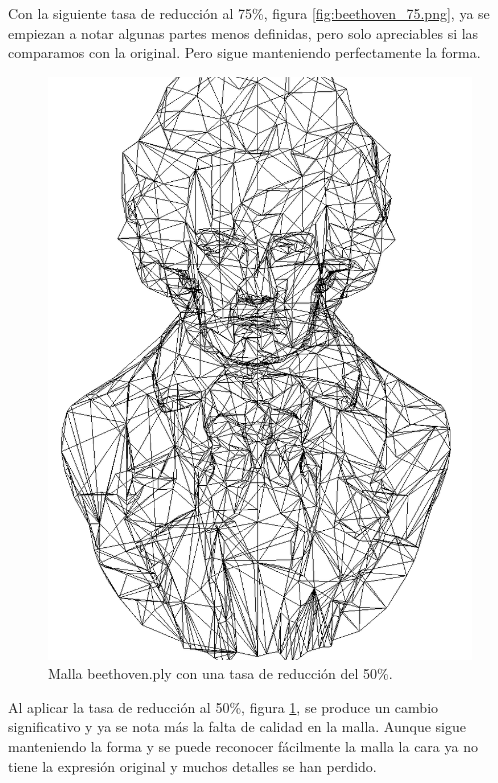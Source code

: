 Con la siguiente tasa de reducción al 75\%, figura \ref{fig:beethoven_75.png}, ya se empiezan a notar algunas partes menos definidas, pero solo apreciables si las comparamos con la original. Pero sigue manteniendo perfectamente la forma.\\
\begin{figure} %
	\centering
	\includegraphics[scale=0.25]{imagenes/beethoven_50.png} 
	\caption{Malla beethoven.ply con una tasa de reducción del 50\%.} \label{fig:beethoven_50.png}
\end{figure}

Al aplicar la tasa de reducción al 50\%, figura \ref{fig:beethoven_50.png}, se produce un cambio significativo y ya se nota más la falta de calidad en la malla. Aunque sigue manteniendo la forma y se puede reconocer fácilmente la malla la cara ya no tiene la expresión original y muchos detalles se han perdido.\\

